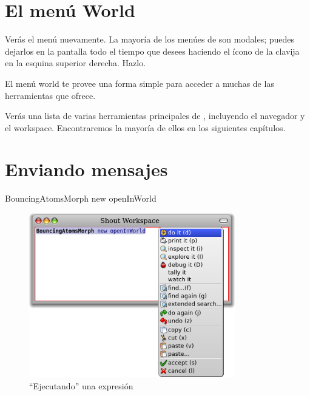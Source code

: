 \documentclass[a4paper,10pt,twoside]{book}
\begin{document}
\section{El men\'u World}

Ver\'as el men\'u  nuevamente.
La mayor\'ia de los men\'ues de \pharo son modales; puedes dejarlos en la pantalla todo el tiempo que desees haciendo \click el \'icono de la clavija en la esquina superior derecha. Hazlo.

El men\'u world te provee una forma simple para acceder a muchas de las herramientas que \pharo ofrece.


Ver\'as una lista de varias herramientas principales de \pharo, incluyendo el navegador y el workspace.
Encontraremos la mayor\'ia de ellos en los siguientes cap\'itulos.

\section{Enviando mensajes}


\begin{code}{}
BouncingAtomsMorph new openInWorld
\end{code}


\begin{figure}[htb]
\centerline {\includegraphics[width=0.8\textwidth]{Doit}}
\caption{``Ejecutando'' una expresi\'on}
\end{figure}
\end{document}
